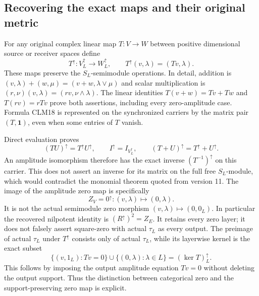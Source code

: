 \documentclass[11pt]{article}
\begin{document}
\subsection{Recovering the exact maps and their original metric}

For any original complex linear map $T:V\to W$ between positive
dimensional source or receiver spaces define
\begin{equation}\tag{CLM18}
T^\uparrow:V^\uparrow_L\longrightarrow W^\uparrow_L,
\qquad T^\uparrow(v,\lambda)=(Tv,\lambda).
\end{equation}
These maps preserve the $S_L$-semimodule operations. In detail, addition
is $(v,\lambda)+(w,\mu)=(v+w,\lambda\vee\mu)$ and scalar
multiplication is $(r,\nu)(v,\lambda)=(rv,\nu\wedge\lambda)$.
The linear identities $T(v+w)=Tv+Tw$ and $T(rv)=rTv$ prove both
assertions, including every zero-amplitude case. Formula CLM18 is
represented on the synchronized carriers by the matrix pair
$(T,\mathbf1)$, even when some entries of $T$ vanish.

Direct evaluation proves
\begin{equation}\tag{CLM19}
(TU)^\uparrow=T^\uparrow U^\uparrow,\qquad
I^\uparrow=I_{V^\uparrow_L},\qquad
(T+U)^\uparrow=T^\uparrow+U^\uparrow.
\end{equation}
An amplitude isomorphism therefore has the exact inverse
$(T^{-1})^\uparrow$ on this carrier. This does not assert an inverse
for its matrix on the full free $S_L$-module, which would contradict
the monomial theorem quoted from version 11. The image of the
amplitude zero map is specifically
\begin{equation}\tag{CLM20}
Z_V=0^\uparrow:(v,\lambda)\longmapsto(0,\lambda).
\end{equation}
It is not the actual semimodule zero morphism
$(v,\lambda)\mapsto(0,0_L)$. In particular the recovered nilpotent
identity is $(R^\uparrow)^2=Z_E$. It retains every zero layer; it does
not falsely assert square-zero with actual $\tau_L$ as every output.
The preimage of actual $\tau_L$ under $T^\uparrow$ consists only of
actual $\tau_L$, while its layerwise kernel is the exact subset
\[
\{(v,1_L):Tv=0\}\cup\{(0,\lambda):\lambda\in L\}
 =(\ker T)^\uparrow_L.
\]
This follows by imposing the output amplitude equation $Tv=0$
without deleting the output support. Thus the distinction between
categorical zero and the support-preserving zero map is explicit.
\end{document}

